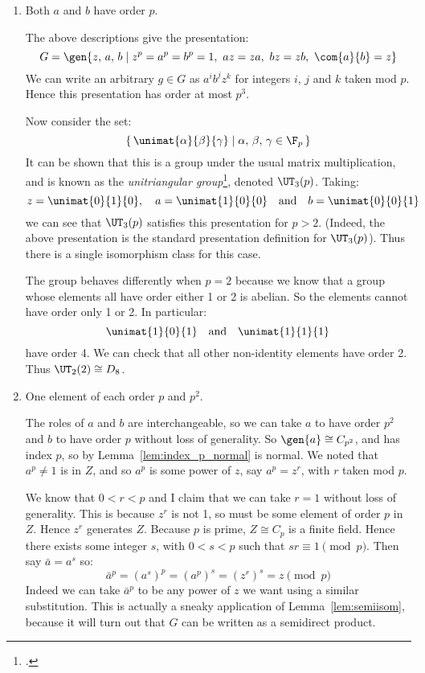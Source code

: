 \begin{enumerate}
    \item Both \(a\) and \(b\) have order \(p\).

        The above descriptions give the presentation:
        \[G = \gen{z,\,a,\,b \mid z^p = a^p = b^p = 1,\ az = za,\ bz = zb,\ \com{a}{b} = z}\]
        We can write an arbitrary \(g \in G\) as \(a^i b^j z^k\) for integers \(i\), \(j\) and \(k\) taken mod \(p\).
        Hence this presentation has order at most \(p^3\).

        Now consider the set:
        \[\left\{\,\unimat{\alpha}{\beta}{\gamma} \mid \alpha,\,\beta,\,\gamma \in \F_p\,\right\}\]
        It can be shown that this is a group under the usual matrix multiplication, and is known as the
        \emph{unitriangular group}\footcite{unitriangular}, denoted \(\UT_3(p)\).
        Taking:
        \[z = \unimat{0}{1}{0}, \quad a = \unimat{1}{0}{0} \quad \text{and} \quad b = \unimat{0}{0}{1}\]
        we can see that \(\UT_3(p)\) satisfies this presentation for \(p > 2\).
        (Indeed, the above presentation is the standard presentation definition for \(\UT_3(p)\)).
        Thus there is a single isomorphism class for this case.

        The group behaves differently when \(p = 2\) because we know that a group whose elements all have order either 1
        or 2 is abelian.
        So the elements cannot have order only 1 or 2.
        In particular:
        \[\unimat{1}{0}{1} \quad \text{and} \quad \unimat{1}{1}{1}\]
        have order 4.
        We can check that all other non-identity elements have order 2.
        Thus \(\UT_2(2) \cong D_8\).

    \item One element of each order \(p\) and \(p^2\).

        The roles of \(a\) and \(b\) are interchangeable, so we can take \(a\) to have order \(p^2\) and \(b\) to have
        order \(p\) without loss of generality.
        So \(\gen{a} \cong C_{p^2}\), and has index \(p\), so by Lemma~\ref{lem:index_p_normal} is normal.
        We noted that \(a^p \neq 1\) is in \(Z\), and so \(a^p\) is some power of \(z\), say \(a^p = z^r\), with \(r\)
        taken mod \(p\).

        We know that \(0 < r < p\) and I claim that we can take \(r = 1\) without loss of generality.
        This is because \(z^r\) is not 1, so must be some element of order \(p\) in \(Z\).
        Hence \(z^r\) generates \(Z\).
        Because \(p\) is prime, \(Z \cong C_p\) is a finite field.
        Hence there exists some integer \(s\), with \(0 < s < p\) such that \(sr \equiv 1 \pmod{p}\).
        Then say \(\bar{a} = a^s\) so:
        \[\bar{a}^p = {(a^s)}^p = {(a^p)}^s = {(z^r)}^s = z \pmod{p}\]
        Indeed we can take \(\bar{a}^p\) to be any power of \(z\) we want using a similar substitution.
        This is actually a sneaky application of Lemma~\ref{lem:semiisom}, because it will turn out that \(G\) can be
        written as a semidirect product.


\end{enumerate}
